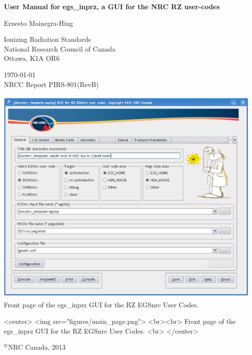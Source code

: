 \documentclass[12pt,twoside]{article}   %
\newcommand{\supcopyright}{$^{\copyright}$}       %
\begin{document}
\begin{center}
{\sffamily \bfseries {\Huge User Manual for egs\_inprz, a GUI for the NRC RZ user-codes}
\vspace{5mm}\\}
\begin{Large}
Ernesto Mainegra-Hing \\
\end{Large}
Ionizing Radiation Standards\\
National Research Council of Canada
\\Ottawa, K1A OR6\\
\vspace{10mm}

\today \vspace{3mm}\\
\hfill NRCC Report {\sf PIRS-801}(RevB) \vspace*{10mm}\\

\begin{latexonly}
\begin{center}
\includegraphics[height=11cm]{figures/main_page}
\vspace{5mm}
\\Front page of the egs\_inprz GUI for the RZ EGSnrc User Codes.
\vspace{10mm}\\
\end{center}
\end{latexonly}
\begin{htmlonly}
\begin{rawhtml}
<center>
<img src="figures/main_page.png">
<br><br>
Front page of the egs\_inprz GUI for the RZ EGSnrc User Codes.
<br>
</center>
\end{rawhtml}
\end{htmlonly}

\supcopyright NRC Canada, 2013

\end{center}
\newpage   %
\mbox{}
\end{document}
